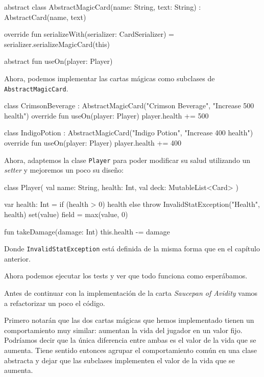   \begin{kotlin}
    abstract class AbstractMagicCard(name: String, text: String) :
        AbstractCard(name, text) {
      override fun serializeWith(serializer: CardSerializer) =
        serializer.serializeMagicCard(this)

      abstract fun useOn(player: Player)
    }
  \end{kotlin}

  Ahora, podemos implementar las cartas mágicas como subclases de \texttt{AbstractMagicCard}.

  \begin{kotlin}
    class CrimsonBeverage :
        AbstractMagicCard("Crimson Beverage", "Increase 500 health") {
      override fun useOn(player: Player) {
        player.health += 500
      }
    }
  \end{kotlin}

  \begin{kotlin}
    class IndigoPotion :
        AbstractMagicCard("Indigo Potion", "Increase 400 health") {
      override fun useOn(player: Player) {
        player.health += 400
      }
    }
  \end{kotlin}

  Ahora, adaptemos la clase \texttt{Player} para poder modificar su salud utilizando un 
  \textit{setter} y mejoremos un poco su diseño:

  \begin{kotlin}
    class Player(
      val name: String,
      health: Int,
      val deck: MutableList<Card>
    ) {
      var health: Int =
        if (health > 0) health else throw InvalidStatException("Health", health)
        set(value) {
          field = max(value, 0)
        }

      fun takeDamage(damage: Int) {
        this.health -= damage
      }
    }
  \end{kotlin}

  Donde \texttt{InvalidStatException} está definida de la misma forma que en el capítulo anterior.

  Ahora podemos ejecutar los tests y ver que todo funciona como esperábamos.

  Antes de continuar con la implementación de la carta \textit{Saucepan of Avidity} vamos a
  refactorizar un poco el código.

  Primero notarán que las dos cartas mágicas que hemos implementado tienen un comportamiento
  muy similar: aumentan la vida del jugador en un valor fijo.
  Podríamos decir que la única diferencia entre ambas es el valor de la vida que se aumenta.
  Tiene sentido entonces agrupar el comportamiento común en una clase abstracta y dejar que
  las subclases implementen el valor de la vida que se aumenta.

